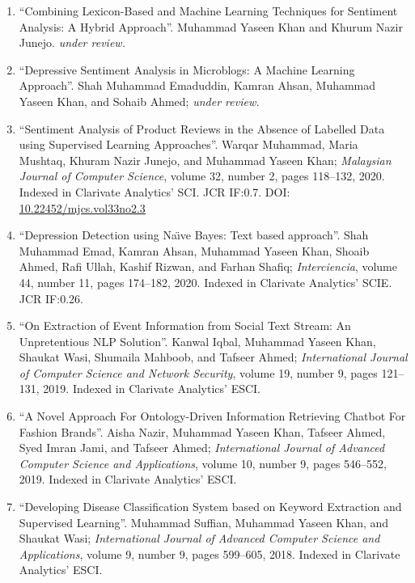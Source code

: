 \documentclass[a4paper, 10pt]{article}
\begin{document}
\begin{enumerate}
\itemsep-4pt 
	\item ``Combining Lexicon-Based and Machine Learning Techniques for Sentiment Analysis: A Hybrid Approach''. Muhammad Yaseen Khan and Khurum Nazir Junejo. \emph{\small under review.}
       
	\item ``Depressive Sentiment Analysis in Microblogs: A Machine Learning Approach''. Shah Muhammad Emaduddin, Kamran Ahsan, Muhammad Yaseen Khan, and Sohaib Ahmed; \emph{\small under review.}
       
    \item ``Sentiment Analysis of Product Reviews in the Absence of Labelled Data using Supervised Learning Approaches''. Warqar Muhammad, Maria Mushtaq, Khuram Nazir Junejo, and Muhammad Yaseen Khan; \emph{Malaysian Journal of Computer Science}, volume 32, number 2, pages 118--132, 2020. Indexed in Clarivate Analytics' SCI. JCR IF:0.7. DOI: \href{10.22452/mjcs.vol33no2.3}{10.22452/mjcs.vol33no2.3}
    
    \item ``Depression Detection using Na\"{\i}ve Bayes: Text based approach''. Shah Muhammad Emad, Kamran Ahsan, Muhammad Yaseen Khan, Shoaib Ahmed, Rafi Ullah, Kashif Rizwan, and Farhan Shafiq; \emph{Interciencia}, volume 44, number 11, pages 174--182, 2020. Indexed in Clarivate Analytics' SCIE. JCR IF:0.26.
	
	\item ``On Extraction of Event Information from Social Text Stream: An Unpretentious NLP Solution''. Kanwal Iqbal, Muhammad Yaseen Khan, Shaukat Wasi, Shumaila Mahboob, and Tafseer Ahmed; \emph{International Journal of Computer Science and Network Security}, volume 19, number 9, pages 121--131, 2019. Indexed in Clarivate Analytics' ESCI.
 
	\item ``A Novel Approach For Ontology-Driven Information Retrieving Chatbot For Fashion Brands''. Aisha Nazir, Muhammad Yaseen Khan, Tafseer Ahmed, Syed Imran Jami, and Tafseer Ahmed; \emph{International Journal of Advanced Computer Science and Applications}, volume 10, number 9, pages 546--552, 2019. Indexed in Clarivate Analytics' ESCI. 
      
	\item ``Developing Disease Classification System based on Keyword Extraction and Supervised Learning''. Muhammad Suffian, Muhammad Yaseen Khan, and Shaukat Wasi; \emph{International Journal of Advanced Computer Science and Applications}, volume 9, number 9, pages 599--605, 2018. Indexed in Clarivate Analytics' ESCI.
\end{enumerate}
\end{document}
